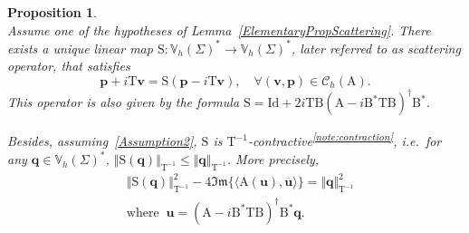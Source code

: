 \documentclass[a4paper,11pt]{article}
\newcommand{\mA}{\mathrm{A}}
\newcommand{\mB}{\mathrm{B}}
\newcommand{\Id}{\mathrm{Id}}
\newcommand{\mT}{\mathrm{T}}
\newcommand{\mS}{\mathrm{S}}
\newcommand{\mbV}{\mathbb{V}}
\newcommand{\bp}{\boldsymbol{p}}
\newcommand{\bu}{\boldsymbol{u}}
\newcommand{\bv}{\boldsymbol{v}}
\newcommand{\bq}{\boldsymbol{q}}
\renewcommand{\Im}{\mathfrak{Im}} %
\newtheorem{prop}[defn]{Proposition}
\begin{document}
\begin{prop}\label{ProposistionContractivity}\quad\\
  Assume one of the hypotheses of Lemma~\ref{ElementaryPropScattering}. There exists a unique
  linear map $\mS\colon \mbV_h(\Sigma)^{*}\to \mbV_h(\Sigma)^{*}$, later
  referred to as \emph{scattering operator}, that satisfies
  \begin{equation}\label{ScatteringOperator}
    \bp+i\mT\bv = \mS(\bp-i\mT\bv),\quad \forall (\bv,\bp)\in
    \mathscr{C}_h(\mA).
  \end{equation}
  This operator is also given by the formula $\mS = \Id
  +2i\mT\mB(\mA-i\mB^*\mT\mB)^{\dagger}\mB^*$. 
  
  Besides, assuming~\eqref{Assumption2}, \(\mS\) is
  $\mT^{-1}$-contractive\textsuperscript{\ref{note:contraction}}, i.e.~for any $\bq\in \mbV_h(\Sigma)^{*}$, $\Vert \mS(\bq)\Vert_{\mT^{-1}} \le \Vert \bq \Vert_{\mT^{-1}}$. 
  More precisely,
  \begin{equation}\label{Contractivity}
    \begin{aligned}
      & \Vert \mS(\bq)\Vert_{\mT^{-1}}^{2} - 
      4\Im\{ \langle \mA(\bu),\overline{\bu}\rangle\} = \Vert \bq\Vert_{\mT^{-1}}^{2}\\
      & \text{where}\;\;\bu = (\mA-i\mB^*\mT\mB)^{\dagger}\mB^*\bq. 
    \end{aligned}
  \end{equation}
\end{prop}
\end{document}

